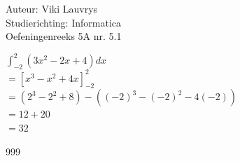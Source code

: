 \documentclass[a4paper]{article}
\begin{document}
  
\noindent \large Auteur: Viki	Lauvrys \\
\noindent \large Studierichting: Informatica\\
\noindent \large Oefeningenreeks 5A nr. 5.1\\

\medskip

\normalsize

$\displaystyle\int_{-2}^{2}  (3x^2 -2x + 4) dx $\\

$= \left[ x^3 -x^2 + 4x \right]_{-2}^{2}$\\

$= (2^3 -2^2 +8) - ((-2)^3 -(-2)^2 -4(-2))$\\

$= 12+20$\\

$= 32$\\

\begin{thebibliography}{999}
\end{thebibliography}
\end{document}
